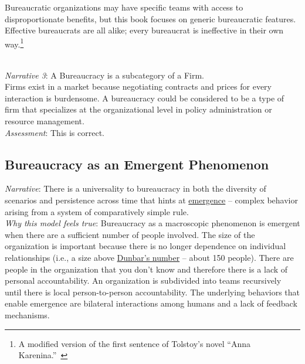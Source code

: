 Bureaucratic organizations may have specific teams with access to disproportionate benefits, but this book focuses on generic bureaucratic features. Effective bureaucrats are all alike; every bureaucrat is ineffective in their own way.\footnote{A modified version of the first sentence of Tolstoy's novel ``Anna Karenina.''~\cite{1878_Tolsty}}



\ \\
\textit{Narrative 3}: A Bureaucracy is a subcategory of a Firm. \\
Firms exist in a market because negotiating contracts and prices for every interaction is burdensome. 
A bureaucracy could be considered to be a type of firm that specializes at the organizational level in policy administration or resource management. \\
\textit{Assessment}: This is correct.



\subsection*{Bureaucracy as an Emergent Phenomenon}

\textit{Narrative}: There is a universality to bureaucracy in both the diversity of scenarios and persistence across time that hints at \href{https://en.wikipedia.org/wiki/Emergence}{emergence} -- complex behavior arising from a system of comparatively simple rule.\\
\iftoggle{WPinmargin}{\marginpar{$>$Wikipedia: emergence}}{}
\textit{Why this model feels true}: Bureaucracy as a macroscopic phenomenon is emergent when there are a sufficient number of people involved. The size of the organization is important because there is no longer dependence on individual relationships (i.e., a size above \href{https://en.wikipedia.org/wiki/Dunbar\%27s_number}{Dunbar's number} -- about 150 people). 
\iftoggle{WPinmargin}{\marginpar{$>$Wikipedia: Dunbar's numbers}}{}
There are people in the organization that you don't know and therefore there is a lack of personal accountability. An organization is subdivided into teams recursively until there is local person-to-person accountability.  The underlying behaviors that enable emergence are bilateral interactions among humans and a lack of feedback mechanisms. 

